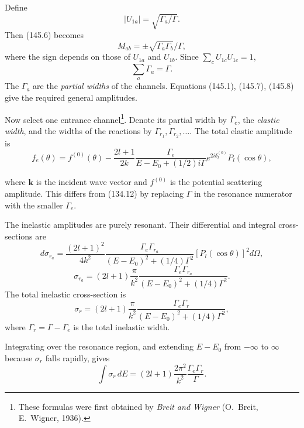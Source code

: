 Define
\[
 |U_{1a}|=\sqrt{\Gamma_a/\Gamma}.
\]
Then (145.6) becomes
\begin{equation}
 M_{ab}=\pm\sqrt{\Gamma_a\Gamma_b}/\Gamma,
 \tag{145.7}
\end{equation}
where the sign depends on those of $U_{1a}$ and $U_{1b}$. Since
$\sum_cU_{1c}U_{1c}=1$,
\begin{equation}
 \sum_a\Gamma_a=\Gamma.
 \tag{145.8}
\end{equation}
The $\Gamma_a$ are the \emph{partial widths} of the channels. Equations
(145.1), (145.7), (145.8) give the required general amplitudes.

Now select one entrance channel\footnote{These formulas were first obtained
by \emph{Breit and Wigner} (O.~Breit, E.~Wigner, 1936).}. Denote its partial
width by $\Gamma_e$, the \emph{elastic width}, and the widths of the reactions
by $\Gamma_{r_1},\Gamma_{r_2},\ldots$. The total elastic amplitude is
\begin{equation}
 f_e(\theta)=f^{(0)}(\theta)-\frac{2l+1}{2k}
 \frac{\Gamma_e}{E-E_0+(1/2)i\Gamma}e^{2i\delta_l^{(0)}}P_l(\cos\theta),
 \tag{145.9}
\end{equation}

where $\mathbf k$ is the incident wave vector and $f^{(0)}$ is the potential
scattering amplitude. This differs from (134.12) by replacing $\Gamma$ in the
resonance numerator with the smaller $\Gamma_e$.

The inelastic amplitudes are purely resonant. Their differential and integral
cross-sections are
\begin{equation}
 d\sigma_{r_a}=\frac{(2l+1)^2}{4k^2}
 \frac{\Gamma_e\Gamma_{r_a}}{(E-E_0)^2+(1/4)\Gamma^2}
 [P_l(\cos\theta)]^2d\Omega,
 \tag{145.10}
\end{equation}
\begin{equation}
 \sigma_{r_a}=(2l+1)\frac\pi{k^2}
 \frac{\Gamma_e\Gamma_{r_a}}{(E-E_0)^2+(1/4)\Gamma^2}.
 \tag{145.11}
\end{equation}
The total inelastic cross-section is
\begin{equation}
 \sigma_r=(2l+1)\frac\pi{k^2}
 \frac{\Gamma_e\Gamma_r}{(E-E_0)^2+(1/4)\Gamma^2},
 \tag{145.12}
\end{equation}
where $\Gamma_r=\Gamma-\Gamma_e$ is the total inelastic width.

Integrating over the resonance region, and extending $E-E_0$ from
$-\infty$ to $\infty$ because $\sigma_r$ falls rapidly, gives
\begin{equation}
 \int\sigma_r\,dE=(2l+1)\frac{2\pi^2}{k^2}\frac{\Gamma_e\Gamma_r}{\Gamma}.
 \tag{145.13}
\end{equation}

